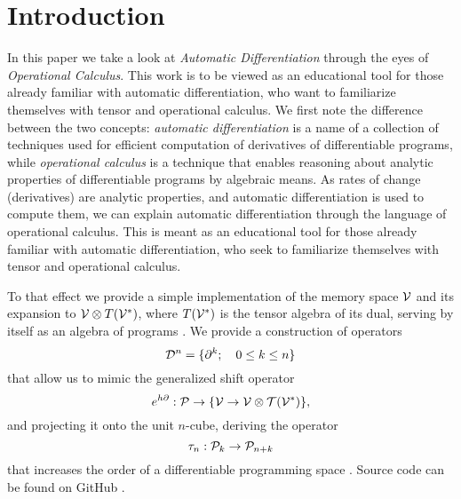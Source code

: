 \section{Introduction}\label{sec:introduction}

In this paper we take a look at \emph{Automatic Differentiation} through the eyes of \emph{Operational Calculus}. This work is to be viewed as an educational tool for those already familiar with automatic differentiation, who want to familiarize themselves with tensor and operational calculus. We first note the difference between the two concepts: \emph{automatic differentiation} is a name of a collection of techniques used for efficient computation of derivatives of differentiable programs, while \emph{operational calculus} is a technique that enables reasoning about analytic properties of differentiable programs by algebraic means. As rates of change (derivatives) are analytic properties, and automatic differentiation is used to compute them, we can explain automatic differentiation through the language of operational calculus. This is meant as an educational tool for those already familiar with automatic differentiation, who seek to familiarize themselves with tensor and operational calculus.

To that effect we provide a simple implementation of the memory space $\mathcal{V}$ and its expansion to $\mathcal{V}\otimes T(\mathcal{V}^*)$, where $T(\mathcal{V}^*)$ is the tensor algebra of its dual, serving by itself as an algebra of programs \cite[Definition~4.1]{OperationalCalculus}.
We provide a construction of operators
\begin{equation}
\mathcal{D}^n=\{\partial^k;\quad 0\le k\le n\}
\end{equation}
that allow us to mimic the generalized shift operator \cite[Theorem~5.2]{OperationalCalculus}
 \begin{equation}
   e^{h\partial}:\mathcal{P}\to \{\mathcal{V}\to \mathcal{V}\otimes \mathcal{T}(\mathcal{V}^*)\},
         \end{equation}
and projecting it onto the unit $n$-cube, deriving the operator 
\begin{equation}\label{eq:sumd}
\tau_n:\mathcal{P}_k\to\mathcal{P}_{n+k}
\end{equation} 
that increases the order of a differentiable programming space \cite[Proposition~5.1]{OperationalCalculus}.
Source code can be found on GitHub \cite{dCpp}.

